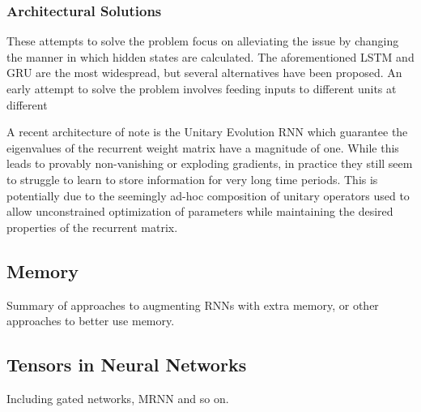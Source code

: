 \subsubsection{Architectural Solutions}
These attempts to solve the problem focus on alleviating the issue by changing the manner in which
hidden states are calculated. The aforementioned LSTM and GRU are the most widespread, but
several alternatives have been proposed. 
An early attempt to solve the problem involves feeding inputs to different units at different


A recent architecture of note is the Unitary Evolution RNN
\autocite{Arjovsky2015} which guarantee the eigenvalues of the recurrent weight matrix have a
magnitude of one. While this leads to provably non-vanishing or exploding gradients, in
practice they still seem to struggle to learn to store information for very long time periods.
This is potentially due to the seemingly ad-hoc composition of unitary operators used to allow
unconstrained optimization of parameters while maintaining the desired properties of the
recurrent matrix.



\subsection{Memory}
Summary of approaches to augmenting RNNs with extra memory, or other approaches to better
use memory.
\subsection{Tensors in Neural Networks}
Including gated networks, MRNN and so on.
